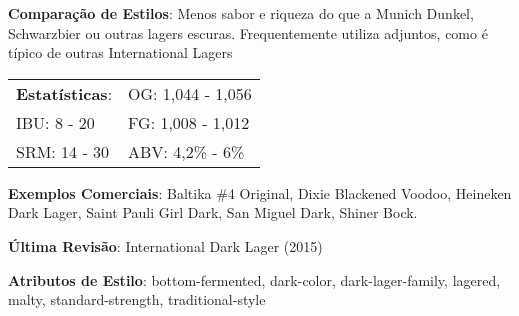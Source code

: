 \textbf{Comparação de Estilos}: Menos sabor e riqueza do que a Munich Dunkel, Schwarzbier ou outras lagers escuras. Frequentemente utiliza adjuntos, como é típico de outras International Lagers

\begin{tabular}{@{}p{35mm}p{35mm}@{}}
  \textbf{Estatísticas}: & OG: 1,044 - 1,056 \\
  IBU: 8 - 20 & FG: 1,008 - 1,012 \\
  SRM: 14 - 30 & ABV: 4,2\% - 6\%
  \end{tabular}

\textbf{Exemplos Comerciais}: Baltika \#4 Original, Dixie Blackened Voodoo, Heineken Dark Lager, Saint Pauli Girl Dark, San Miguel Dark, Shiner Bock.

\textbf{Última Revisão}: International Dark Lager (2015)

\textbf{Atributos de Estilo}: bottom-fermented, dark-color, dark-lager-family, lagered, malty, standard-strength, traditional-style